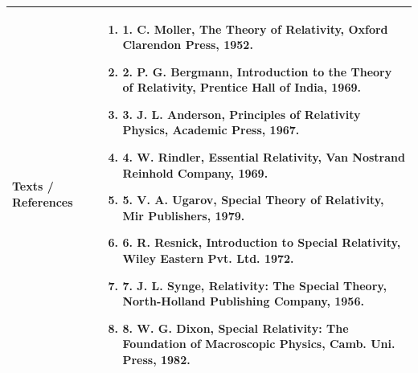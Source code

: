 \documentclass[11pt,a4paper]{article}
\begin{document}
\vspace{8pt}
\renewcommand{\arraystretch}{1.3}
\begin{tabularx}{\textwidth}{|p{3.2cm}|X|}
\hline
\textbf{Texts / References} & \begin{enumerate}[leftmargin=*,noitemsep,topsep=2pt]  \item 1. C. Moller, The Theory of Relativity, Oxford Clarendon Press, 1952.  \item 2. P. G. Bergmann, Introduction to the Theory of Relativity, Prentice Hall of India, 1969.  \item 3. J. L. Anderson, Principles of Relativity Physics, Academic Press, 1967.  \item 4. W. Rindler, Essential Relativity, Van Nostrand Reinhold Company, 1969.  \item 5. V. A. Ugarov, Special Theory of Relativity, Mir Publishers, 1979.  \item 6. R. Resnick, Introduction to Special Relativity, Wiley Eastern Pvt. Ltd. 1972.  \item 7. J. L. Synge, Relativity: The Special Theory, North-Holland Publishing Company, 1956.  \item 8. W. G. Dixon, Special Relativity: The Foundation of Macroscopic Physics, Camb. Uni. Press, 1982.\end{enumerate} \\
\hline
\end{tabularx}
\clearpage
\end{document}
